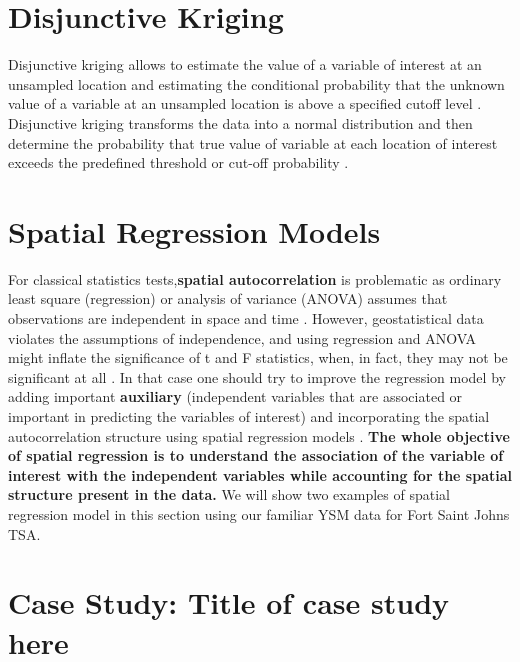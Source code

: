 \documentclass[
]{book}
\begin{document}
\hypertarget{disjunctive-kriging}{%
\section{Disjunctive Kriging}\label{disjunctive-kriging}}

Disjunctive kriging allows to estimate the value of a variable of interest at an unsampled location and estimating the conditional probability that the unknown value of a variable at an unsampled location is above a specified cutoff level \citep{yates_disjunctive_1986}. Disjunctive kriging transforms the data into a normal distribution and then determine the probability that true value of variable at each location of interest exceeds the predefined threshold or cut-off probability \citep{daya_comparative_2015}.

\hypertarget{spatial-regression-models}{%
\section{Spatial Regression Models}\label{spatial-regression-models}}

For classical statistics tests,\textbf{spatial autocorrelation} is problematic as ordinary least square (regression) or analysis of variance (ANOVA) assumes that observations are independent in space and time \citep{meng_spatial_2009}. However, geostatistical data violates the assumptions of independence, and using regression and ANOVA might inflate the significance of t and F statistics, when, in fact, they may not be significant at all \citep{meng_spatial_2009}. In that case one should try to improve the regression model by adding important \textbf{auxiliary} (independent variables that are associated or important in predicting the variables of interest) and incorporating the spatial autocorrelation structure \citep{meng_spatial_2009} using spatial regression models \citep{anselin_spatial_1998}. \textbf{The whole objective of spatial regression is to understand the association of the variable of interest with the independent variables while accounting for the spatial structure present in the data.} We will show two examples of spatial regression model in this section using our familiar YSM data for Fort Saint Johns TSA.

\hypertarget{case-study-title-of-case-study-here-4}{%
\section{Case Study: Title of case study here}\label{case-study-title-of-case-study-here-4}}
\end{document}
